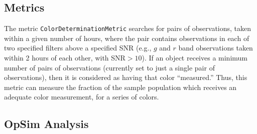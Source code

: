 
\subsection{Metrics}
\label{sec:\secname:metrics}

The metric {\tt ColorDeterminationMetric} searches for pairs of
observations, taken within a given number of hours, where the pair
contains observations in each of two specified filters above a
specified SNR (e.g., $g$ and $r$ band observations taken within 2
hours of each other, with SNR$>10$). If an object receives a minimum
number of pairs of observations (currently set to just a single pair
of observations), then it is considered as having that color
``measured.'' Thus, this metric can measure the fraction of the sample
population which receives an adequate color measurement, for a series
of colors.



\subsection{OpSim Analysis}
\label{sec:\secname:analysis}

